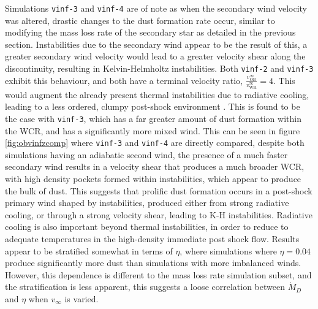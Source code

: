 Simulations \texttt{vinf-3} and \texttt{vinf-4} are of note as when the secondary wind velocity was altered, drastic changes to the dust formation rate occur, similar to modifying the mass loss rate of the secondary star as detailed in the previous section.
Instabilities due to the secondary wind appear to be the result of this, a greater secondary wind velocity would lead to a greater velocity shear along the discontinuity, resulting in Kelvin-Helmholtz instabilities.
Both \texttt{vinf-2} and \texttt{vinf-3} exhibit this behaviour, and both have a terminal velocity ratio, $\frac{v_\text{OB}^\infty}{v_\text{WR}^\infty} = 4$.
This would augment the already present thermal instabilities due to radiative cooling, leading to a less ordered, clumpy post-shock environment \parencite{stevens_colliding_1992}.
This is found to be the case with \texttt{vinf-3}, which has a far greater amount of dust formation within the WCR, and has a significantly more mixed wind.
This can be seen in figure \ref{fig:obvinfzcomp} where \texttt{vinf-3} and \texttt{vinf-4} are directly compared, despite both simulations having an adiabatic second wind, the presence of a much faster secondary wind results in a velocity shear that produces a much broader WCR, with high density pockets formed within instabilities, which appear to produce the bulk of dust. 
This suggests that prolific dust formation occurs in a post-shock primary wind shaped by instabilities, produced either from strong radiative cooling, or through a strong velocity shear, leading to K-H instabilities.
Radiative cooling is also important beyond thermal instabilities, in order to reduce to adequate temperatures in the high-density immediate post shock flow.
Results appear to be stratified somewhat in terms of $\eta$, where simulations where $\eta = 0.04$ produce significantly more dust than simulations with more imbalanced winds.
However, this dependence is different to the mass loss rate simulation subset, and the stratification is less apparent, this suggests a loose correlation between $\dot M_D$ and $\eta$ when $v_\infty$ is varied.


